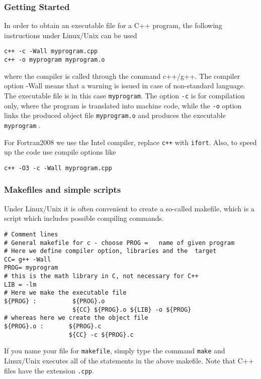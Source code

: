 \documentclass{beamer}
\newenvironment{block_mdfboxadmon}[1][]{\begin{block}{#1}}{\end{block}}
\begin{document}
\begin{frame}
\frametitle{Getting Started}

\begin{block_mdfboxadmon}
In order to obtain an executable file for a C++ program, the following
instructions under Linux/Unix can be used

\begin{verbatim}
c++ -c -Wall myprogram.cpp
c++ -o myprogram myprogram.o
\end{verbatim}
where the compiler is called through the command c++/g++. The compiler
option -Wall means that a warning is issued in case of non-standard
language. The executable file is in this case \Verb!myprogram!. The option
\Verb!-c! is for compilation only, where the program is translated into machine code,
while the \Verb!-o! option links the produced object file \Verb!myprogram.o!
and produces the executable \Verb!myprogram! .

For Fortran2008 we use the Intel compiler, replace \Verb!c++! with \Verb!ifort!.
Also, to speed up the code use compile options like

\begin{verbatim}
c++ -O3 -c -Wall myprogram.cpp
\end{verbatim}
\end{block_mdfboxadmon}
\end{frame}

\begin{frame}
\frametitle{Makefiles and simple scripts}

Under Linux/Unix it is often convenient to create a
so-called makefile, which is a script which includes possible
compiling commands.

\begin{verbatim}
# Comment lines
# General makefile for c - choose PROG =   name of given program
# Here we define compiler option, libraries and the  target
CC= g++ -Wall
PROG= myprogram
# this is the math library in C, not necessary for C++
LIB = -lm
# Here we make the executable file
${PROG} :          ${PROG}.o
                   ${CC} ${PROG}.o ${LIB} -o ${PROG}
# whereas here we create the object file
${PROG}.o :       ${PROG}.c
                  ${CC} -c ${PROG}.c
\end{verbatim}
If you name your file for \Verb!makefile!, simply type the command
\Verb!make! and Linux/Unix executes all of the statements in the above
makefile. Note that C++ files have the extension \Verb!.cpp!.
\end{frame}
\end{document}
